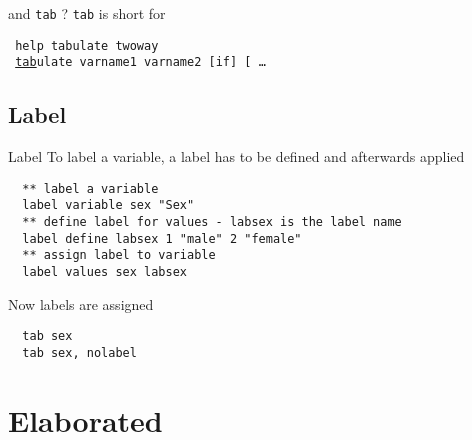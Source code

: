 \begin{frame}[fragile]{and \texttt{tab} ?}
\texttt{tab} is short for\\ \vspace{0.5cm}  
\begin{scriptsize}
\texttt{
  \textcolor{Statakeywords}{help tabulate twoway} \\
  ~\underline{tab}ulate \textcolor{Statakeywords}{varname1} \textcolor{Statakeywords}{varname2} [\textcolor{Statakeywords}{if}] [ \dots
} \vspace{0.5cm}
\end{scriptsize}

\end{frame}

\subsection{Label}
\begin{frame}[fragile]{Label}     
To label a variable, a label has to be defined and afterwards applied
\begin{lstlisting}
  ** label a variable
  label variable sex "Sex"
  ** define label for values - labsex is the label name
  label define labsex 1 "male" 2 "female"
  ** assign label to variable
  label values sex labsex 
\end{lstlisting}
Now labels are assigned
\begin{lstlisting}
  tab sex
  tab sex, nolabel
\end{lstlisting}
\end{frame}

\section{Elaborated}
